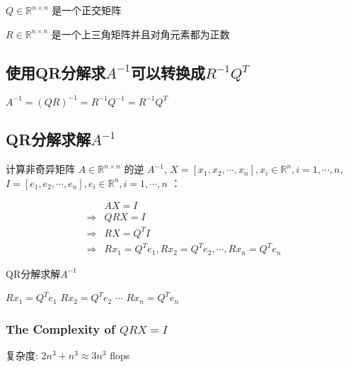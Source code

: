 \begin{corollary}
    $ Q \in \mathbb{R}^{n \times n} $ 是一个正交矩阵
\end{corollary}

\begin{corollary}
    $ R \in \mathbb{R}^{n \times n} $ 是一个上三角矩阵并且对角元素都为正数
\end{corollary}


\subsection{使用QR分解求$A^{-1}$可以转换成$R^{-1} Q^{T}$}

\begin{theorem}
    $ A^{-1}=(Q R)^{-1}=R^{-1} Q^{-1}=R^{-1} Q^{T} $
\end{theorem}

\subsection{QR分解求解$A^{-1}$}


计算非奇异矩阵 $  {A} \in \mathbb{R}^{n \times n} $ 的逆 $  {A}^{-1} $, $X=\left[x_{1}, x_{2}, \cdots, x_{n}\right], x_{i} \in \mathbb{R}^{n}, i=1, \cdots, n$,$I=\left[e_{1}, e_{2}, \cdots, e_{n}\right], e_{i} \in \mathbb{R}^{n}, i=1, \cdots, n$
：


\begin{equation}\begin{aligned}
    &AX = I \\
    \Rightarrow&   Q R X=I \\
    \Rightarrow&   R X =Q^{T} I \\
    \Rightarrow&  R x_{1}= Q^{T} e_{1}, R x_{2}=Q^{T} e_{2}, \cdots, R x_{n}=Q^{T} e_{n}
\end{aligned}\end{equation}

\begin{algorithm}[htbp]
    \caption{QR分解求解$A^{-1}$}
    $R x_{1}= Q^{T} e_{1}$\;
    $R x_{2}=Q^{T} e_{2}$\;
    $\cdots$\;
    $R x_{n}=Q^{T} e_{n}$\;
\end{algorithm}

\subsubsection{The Complexity of $ Q R X=I $}

复杂度: $ 2 n^{3}+n^{3} \approx 3 n^{3} $ flops

